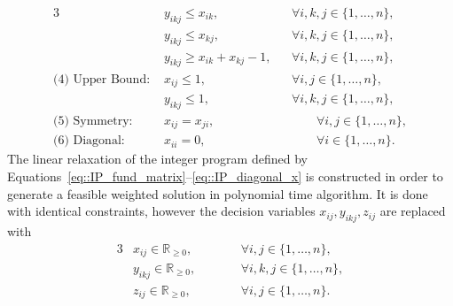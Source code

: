 \documentclass[landscape,a0paper,fontscale=0.36]{baposter} %
\begin{document}
\begin{poster}
{{\begin{alignat}{3}
& y_{ikj} \leq x_{ik}, 
&& \forall i, k, j \in \{1, \dots, n\}, \label{eq::IP_product_upper_first} \\
& y_{ikj} \leq x_{kj}, 
&& \forall i, k, j \in \{1, \dots, n\}, \label{eq::IP_product_upper_second} \\
& y_{ikj} \geq x_{ik} + x_{kj} - 1, 
&& \forall i, k, j \in \{1, \dots, n\}, \label{eq::IP_product_lower} \\
\text{(4) Upper Bound: } 
& x_{ij} \leq 1, 
&& \forall i, j \in \{1, \dots, n\}, \label{eq::IP_x_upper_bound} \\
& y_{ikj} \leq 1, 
&& \forall i, k, j \in \{1, \dots, n\}, \label{eq::IP_y_upper_bound} \\
\text{(5) Symmetry: } 
& x_{ij} = x_{ji}, 
&&\qquad \forall i,j \in \{1, \dots, n\}, \label{eq::IP_symmetry_x} \\
\text{(6) Diagonal: } 
& x_{ii} = 0, 
&&\qquad \forall i \in \{1, \dots, n\}.  \label{eq::IP_diagonal_x}
\end{alignat} \label{eq::integer_program}
The linear relaxation of the integer program defined by Equations~\eqref{eq::IP_fund_matrix}--\eqref{eq::IP_diagonal_x} is 
constructed in order to generate a feasible weighted solution in polynomial time algorithm. It is done with identical constraints,
however the decision variables $x_{ij}, y_{ikj}, z_{ij}$ are replaced with
\begin{alignat}{3}
& x_{ij} \in  \mathbb{R}_{\geq 0}, 
&&\qquad \forall i,j \in \{1, \dots, n\}, \label{eq::LP_x_variable} \\
& y_{ikj} \in \mathbb{R}_{\geq 0}, 
&&\qquad \forall i,k,j \in \{1, \dots, n\}, \label{eq::LP_y_variable} \\
& z_{ij} \in \mathbb{R}_{\geq 0}, 
&&\qquad \forall i,j \in \{1, \dots, n\} \label{eq::LP_z_variable}. 
\end{alignat} 
}
}
\end{poster}
\end{document}

